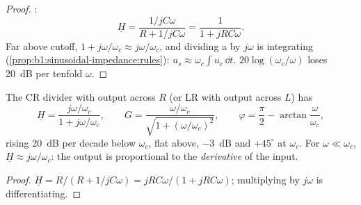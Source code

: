 \begin{proof}
:
\[
\underline H = \frac{1/jC\omega}{R + 1/jC\omega} = \frac{1}{1 + jRC\omega} .
\]
Far above cutoff, $1 + j\omega/\omega_c \approx j\omega/\omega_c$, and
dividing a  by $j\omega$ is integrating
(\cref{prop:b1:sinusoidal-impedance:rules}): $u_s \approx \omega_c\int u_e\,\dd t$.
$20\log(\omega_c/\omega)$ loses \qty{20}{dB} per tenfold $\omega$.
\end{proof}

\begin{proposition}\label{prop:b1:filters-transfer-functions:highpass1}
The CR divider with output across $R$ (or LR with output across $L$)
has
\[
\underline H = \frac{j\omega/\omega_c}{1 + j\omega/\omega_c},
\qquad G = \frac{\omega/\omega_c}{\sqrt{1 + (\omega/\omega_c)^2}},
\qquad \varphi = \frac{\pi}{2} - \arctan\frac{\omega}{\omega_c},
\]
rising \qty{20}{dB} per decade below $\omega_c$, flat above, \qty{-3}{dB}
and $+45^\circ$ at $\omega_c$. For $\omega \ll \omega_c$, $\underline H
\approx j\omega/\omega_c$: the output is proportional to the
\emph{derivative} of the input.
\end{proposition}

\begin{proof}
$\underline H = R/(R + 1/jC\omega) = jRC\omega/(1 + jRC\omega)$;
multiplying by $j\omega$ is differentiating.
\end{proof}


